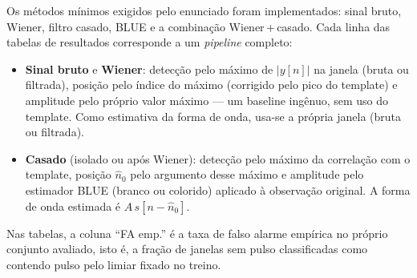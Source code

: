 Os métodos mínimos exigidos pelo enunciado foram implementados: sinal bruto,
Wiener, filtro casado, BLUE e a combinação Wiener\,+\,casado. Cada linha das
tabelas de resultados corresponde a um \emph{pipeline} completo:

\begin{itemize}
  \item \textbf{Sinal bruto} e \textbf{Wiener}: detecção pelo máximo de
  \(|y[n]|\) na janela (bruta ou filtrada), posição pelo índice do máximo
  (corrigido pelo pico do template) e amplitude pelo próprio valor máximo ---
  um baseline ingênuo, sem uso do template. Como estimativa da forma de onda,
  usa-se a própria janela (bruta ou filtrada).
  \item \textbf{Casado} (isolado ou após Wiener): detecção pelo máximo da
  correlação com o template, posição \(\hat{n}_0\) pelo argumento desse máximo
  e amplitude pelo estimador BLUE (branco ou colorido) aplicado à observação
  original. A forma de onda estimada é \(\hat{A}\,s[n-\hat{n}_0]\).
\end{itemize}

Nas tabelas, a coluna ``FA emp.'' é a taxa de falso alarme empírica no próprio
conjunto avaliado, isto é, a fração de janelas sem pulso classificadas como
contendo pulso pelo limiar fixado no treino.
